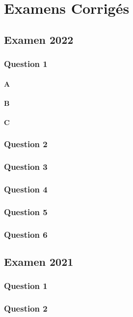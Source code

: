 \chapter{Examens Corrig\'es}\label{chap:examens}

\section{Examen 2022}
\subsection*{Question 1}
\subsubsection*{A}
\subsubsection*{B}
\subsubsection*{C}
\subsection*{Question 2}
\subsection*{Question 3}
\subsection*{Question 4}
\subsection*{Question 5}
\subsection*{Question 6}

\newpage
\section{Examen 2021}
\subsection*{Question 1}
\subsection*{Question 2}
